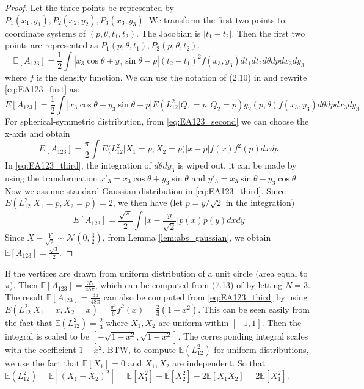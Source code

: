 \documentclass{article}
\def\E{\mathbb{E}}
\begin{document}
\begin{proof}
    Let the three points be represented by
    $P_1(x_1, y_1), P_2(x_2, y_2), P_3(x_3, y_3)$.
    We transform the first two points to coordinate
    systems of $(p, \theta, t_1, t_2)$.
    The Jacobian is $|t_1 - t_2|$. Then the first two
    points are represented as
    $P_1(p, \theta, t_1), P_2(p, \theta, t_2)$.
    \begin{equation}\label{eq:EA123_first}
        \E[A_{123}]
        = \frac{1}{2}\int
        |x_3 \cos\theta + y_3 \sin\theta - p|
        (t_2-t_1)^2 f(x_3, y_3) dt_1dt_2 d\theta dp dx_3dy_3
    \end{equation}
    where $f$ is the density function.
    We can use the notation of (2.10) in \cite{efron1965convex}
    and rewrite \eqref{eq:EA123_first} as:
    \begin{equation}\label{eq:EA123_second}
        E[A_{123}] = \frac{1}{2}\int |x_3 \cos\theta + y_3 \sin\theta - p|
        E(L^2_{12} | Q_1=p, Q_2=p)
        \tilde{g}_2(p, \theta)f(x_3,y_3) d\theta dp dx_3dy_3
    \end{equation}
    For spherical-symmetric distribution, from \eqref{eq:EA123_second}
    we can choose the x-axis and obtain
    \begin{equation}\label{eq:EA123_third}
        E[A_{123}] =\frac{\pi}{2}
        \int E(L^2_{12} | X_1=p, X_2=p)
        |x-p|f(x)f^2(p)dxdp
    \end{equation}
    In \eqref{eq:EA123_third},
    the integration of $d\theta dy_3$
    is wiped out,
    it can be made by using the transformation
    $x'_3 = x_3 \cos \theta + y_3 \sin \theta$
    and $y'_3 = x_3 \sin \theta - y_3 \cos \theta$.
    Now we assume standard Gaussian distribution in \eqref{eq:EA123_third}.
    Since $E(L^2_{12} | X_1=p, X_2=p)=2$, we then have (let $p=y/\sqrt{2}$ in the integration)
    \begin{equation}\label{eq:EA123_fourth}
        E[A_{123}] =\frac{\sqrt{\pi}}{2}\int \Big\vert x-\frac{y}{\sqrt{2}} \Big\vert p(x)p(y)dxdy
    \end{equation}
    Since $X-\frac{Y}{\sqrt{2}} \sim \mathcal{N}(0, \frac{3}{2})$,
    from Lemma
    \ref{lem:abs_gaussian},
    we obtain $\E[A_{123}] = \frac{\sqrt{3}}{2}$.
\end{proof}
If the vertices are drawn from uniform distribution
of a unit circle (area equal to $\pi$). Then
$\E[A_{123}] = \frac{35}{48 \pi}$,
which can be computed from (7.13) of 
\cite{efron1965convex} by letting $N=3$.
The result $\E[A_{123}] = \frac{35}{48 \pi}$
can also be computed from \eqref{eq:EA123_third}
by using $E(L_{12}^2|X_1=x,X_2=x)=\frac{\pi^2}{6}f^2(x)
=\frac{2}{3}(1-x^2)$.
This can be seen easily from the fact that
$\E(L^2_{12}) = \frac{2}{3}$ where $X_1, X_2$ are uniform within $[-1,1]$.
Then the integral is scaled to be $[-\sqrt{1-x^2}, \sqrt{1-x^2}]$.
The corresponding integral scales with the coefficient $1-x^2$.
BTW, to compute
$\E(L^2_{12})$ for uniform distributions,
we use the fact that $\E[X_1]=0$ and
$X_1, X_2$ are independent. So that
$\E(L^2_{12}) =\E[(X_1-X_2)^2] 
=\E[X_1^2]+\E[X_2^2]
-2\E[X_1X_2]=2\E[X_1^2]$.
\end{document}
